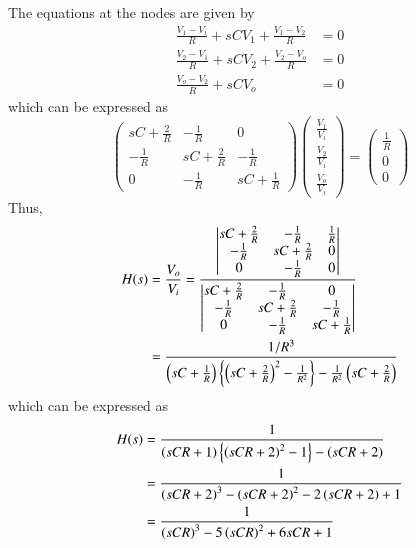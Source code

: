 \solution The equations at the nodes are given by
%
\begin{align}
\frac{V_1-V_i}{R}+ {sCV_1} + \frac{V_1-V_2}{R} &= 0
\\
\frac{V_2-V_1}{R}+ {sCV_2} + \frac{V_2-V_o}{R} &= 0
\\
\frac{V_o-V_2}{R}+ {sCV_o} &= 0
\end{align}
%
which can be expressed as
%
\begin{equation}
\begin{pmatrix}
sC + \frac{2}{R} & -\frac{1}{R} & 0 
\\
-\frac{1}{R}  & sC + \frac{2}{R} & -\frac{1}{R}
\\
0 & -\frac{1}{R} & sC + \frac{1}{R} 
\end{pmatrix}
\begin{pmatrix}
\frac{V_1}{V_i}
\\
\frac{V_2}{V_i}
\\
\frac{V_o}{V_i}
\end{pmatrix}
= 
\begin{pmatrix}
\frac{1}{R}
\\
0
\\
0
\end{pmatrix}
\end{equation}
%
Thus,
\begin{align}
H(s) &= \frac{V_o}{V_i} = 
\frac{
\begin{vmatrix}
sC + \frac{2}{R} & -\frac{1}{R} & \frac{1}{R}
\\
-\frac{1}{R}  & sC + \frac{2}{R} & 0
\\
0 & -\frac{1}{R} & 0
\end{vmatrix}
}{
\begin{vmatrix}
sC + \frac{2}{R} & -\frac{1}{R} & 0 
\\
-\frac{1}{R}  & sC + \frac{2}{R} & -\frac{1}{R}
\\
0 & -\frac{1}{R} & sC + \frac{1}{R} 
\end{vmatrix}
}
\\
&= \frac{1/R^3}{\left(sC + \frac{1}{R} \right)\left\{\left(sC + \frac{2}{R} \right)^2-\frac{1}{R^2}\right\}-\frac{1}{R^2}\left(sC + \frac{2}{R} \right)}
\end{align}
%
which can be expressed as
%
\begin{align}
H(s) &= \frac{1}{\left(sCR + 1 \right)\left\{\left(sCR + 2 \right)^2-1\right\}-\left(sCR + 2 \right)}
\\
&= \frac{1}{\left(sCR + 2 \right)^3 - \left(sCR + 2 \right)^2 - 2\left(sCR + 2 \right) + 1}
\\
&= \frac{1}{\left(sCR\right)^3 - 5 \left(sCR \right)^2 + 6sCR  + 1}
\label{lpf_laplace}
\end{align}
